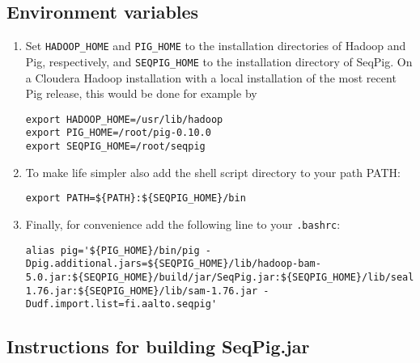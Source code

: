 \documentclass[a4paper,10pt,bibtotoc,abstracton,oneside,noindent,DIV15]{scrartcl}
\begin{document}
\subsection{Environment variables}
\begin{enumerate}
\item Set {\tt HADOOP\_HOME} and {\tt PIG\_HOME} to the installation
directories of Hadoop and Pig, respectively, and {\tt SEQPIG\_HOME} to
the installation directory of SeqPig. On a Cloudera Hadoop installation
with a local installation of the most recent Pig release, this would be
done for example by
\begin{lstlisting} 
export HADOOP_HOME=/usr/lib/hadoop
export PIG_HOME=/root/pig-0.10.0
export SEQPIG_HOME=/root/seqpig 
\end{lstlisting}
%
\item To make life simpler also add the shell script directory to your path PATH:
%
\begin{lstlisting} 
export PATH=${PATH}:${SEQPIG_HOME}/bin
\end{lstlisting}
%
\item Finally, for convenience add the following line to your {\tt .bashrc}:
%
\begin{lstlisting} 
alias pig='${PIG_HOME}/bin/pig -Dpig.additional.jars=${SEQPIG_HOME}/lib/hadoop-bam-5.0.jar:${SEQPIG_HOME}/build/jar/SeqPig.jar:${SEQPIG_HOME}/lib/seal.jar:${SEQPIG_HOME}/lib/picard-1.76.jar:${SEQPIG_HOME}/lib/sam-1.76.jar -Dudf.import.list=fi.aalto.seqpig' 
\end{lstlisting}
%
\end{enumerate}

\subsection{Instructions for building SeqPig.jar}
\end{document}
